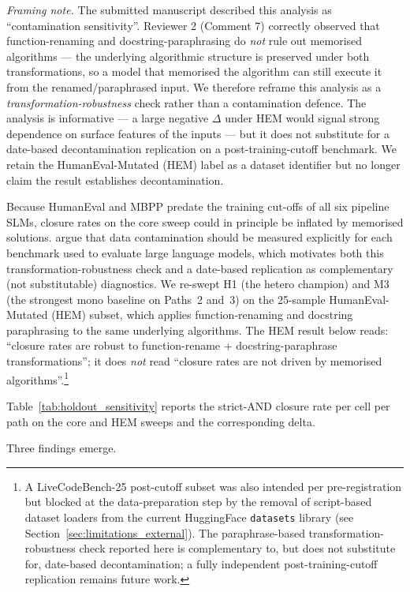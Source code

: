 \emph{Framing note.} The submitted manuscript described this analysis as ``contamination sensitivity''. Reviewer 2 (Comment 7) correctly observed that function-renaming and docstring-paraphrasing do \emph{not} rule out memorised algorithms --- the underlying algorithmic structure is preserved under both transformations, so a model that memorised the algorithm can still execute it from the renamed/paraphrased input. We therefore reframe this analysis as a \emph{transformation-robustness} check rather than a contamination defence. The analysis is informative --- a large negative $\Delta$ under HEM would signal strong dependence on surface features of the inputs --- but it does not substitute for a date-based decontamination replication on a post-training-cutoff benchmark. We retain the HumanEval-Mutated (HEM) label as a dataset identifier but no longer claim the result establishes decontamination.

Because HumanEval and MBPP predate the training cut-offs of all six pipeline SLMs, closure rates on the core sweep could in principle be inflated by memorised solutions. \citet{Sainz2023Contamination} argue that data contamination should be measured explicitly for each benchmark used to evaluate large language models, which motivates both this transformation-robustness check and a date-based replication as complementary (not substitutable) diagnostics. We re-swept H1 (the hetero champion) and M3 (the strongest mono baseline on Paths~2 and~3) on the 25-sample HumanEval-Mutated (HEM) subset, which applies function-renaming and docstring paraphrasing to the same underlying algorithms. The HEM result below reads: ``closure rates are robust to function-rename + docstring-paraphrase transformations''; it does \emph{not} read ``closure rates are not driven by memorised algorithms''.\footnote{A LiveCodeBench-25 post-cutoff subset was also intended per pre-registration but blocked at the data-preparation step by the removal of script-based dataset loaders from the current HuggingFace \texttt{datasets} library (see Section~\ref{sec:limitations_external}). The paraphrase-based transformation-robustness check reported here is complementary to, but does not substitute for, date-based decontamination; a fully independent post-training-cutoff replication remains future work.}

Table~\ref{tab:holdout_sensitivity} reports the strict-AND closure rate per cell per path on the core and HEM sweeps and the corresponding delta.

Three findings emerge.

